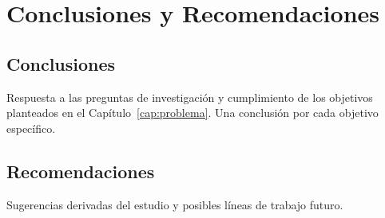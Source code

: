 \chapter{Conclusiones y Recomendaciones}
\label{cap:conclusiones}

\section{Conclusiones}

Respuesta a las preguntas de investigación y cumplimiento de los objetivos
planteados en el Capítulo~\ref{cap:problema}. Una conclusión por cada objetivo
específico.

\section{Recomendaciones}

Sugerencias derivadas del estudio y posibles líneas de trabajo futuro.
